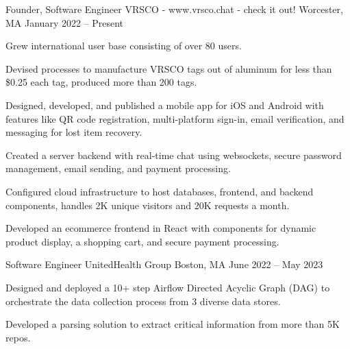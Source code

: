 

\begin{cventries}

  \cventry
    {Founder, Software Engineer} %
    {VRSCO - www.vrsco.chat - check it out!} %
    {Worcester, MA} %
    {January 2022 – Present}
    {
      \begin{cvitems} %
      \item {Grew international user base consisting of over 80 users.}
      \item {Devised processes to manufacture VRSCO tags out of aluminum for less than \$0.25 each tag, produced more than 200 tags.}
      \item {Designed, developed, and published a mobile app for iOS and Android with features like QR code registration, multi-platform sign-in, email verification, and messaging for lost item recovery.}
      \item {Created a server backend with real-time chat using websockets, secure password management, email sending, and payment processing.}
      \item {Configured cloud infrastructure to host databases, frontend, and backend components, handles 2K unique visitors and 20K requests a month.}
      \item {Developed an ecommerce frontend in React with components for dynamic product display, a shopping cart, and secure payment processing.}
      \end{cvitems}
    }
  \cventry
    {Software Engineer} %
    {UnitedHealth Group} %
    {Boston, MA} %
    {June 2022 – May 2023} %
    {
      \begin{cvitems} %
        \item {Designed and deployed a 10+ step Airflow Directed Acyclic Graph (DAG) to orchestrate the data collection process from 3 diverse data stores.}
        \item {Developed a parsing solution to extract critical information from more than 5K repos.}

\end{cvitems}}
\end{cventries}
